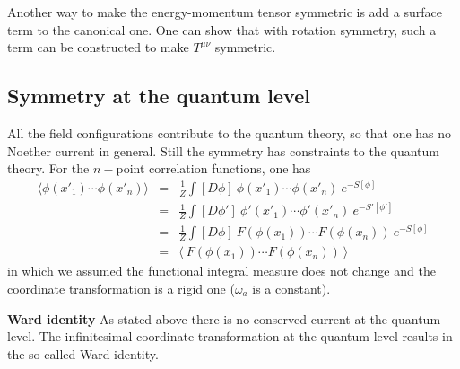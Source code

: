 \documentclass[submission, PhysLectNotes]{SciPost}
\begin{document}
Another way to make the energy-momentum tensor symmetric is add a surface term to the canonical one. One can show that with rotation symmetry, such a term can be constructed to make $T^{\mu\nu}$ symmetric.

\subsection{Symmetry at the quantum level}
All the field configurations contribute to the quantum theory, so that one has no Noether current in general. Still the symmetry has constraints to the quantum theory. For the $n-$point correlation functions, one has
\begin{eqnarray}
\langle \phi(x'_1)\cdots \phi(x'_n) \rangle &=& \frac{1}{Z}\int [D\phi]\ \phi(x'_1)\cdots\phi(x'_n) \ e^{-S[\phi]} \\
&=& \frac{1}{Z}\int [D\phi']\ \phi'(x'_1)\cdots\phi'(x'_n) \ e^{-S'[\phi']} \\
&=& \frac{1}{Z}\int [D\phi]\ F(\phi(x_1))\cdots F(\phi(x_n)) \ e^{-S[\phi]} \\
&=& \langle\ F(\phi(x_1))\cdots F(\phi(x_n)) \ \rangle
\end{eqnarray}
in which we assumed the functional integral measure does not change and the coordinate transformation is a rigid one ($\omega_a$ is a constant).

{\bf Ward identity}
As stated above there is no conserved current at the quantum level. The infinitesimal coordinate transformation at the quantum level results in the so-called Ward identity.
\end{document}
